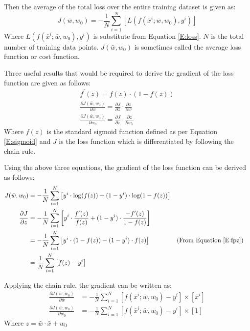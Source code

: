 \documentclass[12pt, a4paper, twoside]{article}
\begin{document}
Then the average of the total loss over the entire training dataset is given as:
\begin{equation}
	J(\bar{w}, w_0) = - \frac{1}{N} \sum_{i = 1}^{N} \left[   L(f(\bar{x}^i; \bar{w}, w_0), y^i)    \right]
\end{equation}
Where $L(f(\bar{x}^i; \bar{w}, w_0), y^i)$ is substitute from Equation \ref{E:loss}. $N$ is the total number of training data points. $J(\bar{w}, w_0)$ is sometimes called the average loss function or cost function.

Three useful results that would be required to derive the gradient of the loss function are given as follows:
\begin{gather}
	f^{\prime}(z) = f(z) \cdot (1-f(z)) \label{E:fpz}\\
	\frac{\partial J(\bar{w}, w_0)}{\partial \bar{w}} = \frac{\partial J}{\partial z} \cdot \frac{\partial z}{\partial \bar{w}} \\
	\frac{\partial J(\bar{w}, w_0)}{\partial w_0} = \frac{\partial J}{\partial z} \cdot \frac{\partial z}{\partial w_0}
\end{gather}
Where $f(z)$ is the standard sigmoid function defined as per Equation \ref{E:sigmoid} and $J$ is the loss function which is differentiated by following the chain rule.

Using the above three equations, the gradient of the loss function can be derived as follows:
\begin{align}
	J(\bar{w}, w_0) &= - \frac{1}{N} \sum_{i=1}^{N} \left[  y^i \cdot \log(f(z)) + (1-y^i) \cdot \log(1-f(z))   \right] \\
	\frac{\partial J}{\partial z} &= - \frac{1}{N} \sum_{i=1}^{N} \left[  y^i \cdot \frac{f^{\prime}(z)}{f(z)} + (1-y^i) \cdot \frac{-f^{\prime}(z)}{1-f(z)}   \right] \\
	&= - \frac{1}{N} \sum_{i=1}^{N} \left[  y^i \cdot (1-f(z)) - (1-y^i) \cdot f(z)   \right] && \text{(From Equation \ref{E:fpz}})\\
	&= \frac{1}{N} \sum_{i=1}^{N} \left[  f(z) - y^i   \right] 
\end{align}

Applying the chain rule, the gradient \cite{ang_ml} can be written as:
\begin{align}
	\frac{\partial J(\bar{w}, w_0)}{\partial \bar{w}} &= - \frac{1}{N} \sum_{i=1}^{N} \left[  f(\bar{x}^i; \bar{w}, w_0) - y^i   \right] \times \left[ \bar{x}^i \right] \\
	\frac{\partial J(\bar{w}, w_0)}{\partial w_0} &= - \frac{1}{N} \sum_{i=1}^{N} \left[  f(\bar{x}^i; \bar{w}, w_0) - y^i   \right] \times \left[ 1 \right] 
\end{align}
Where $z = \bar{w} \cdot \bar{x} + w_0$ 
\end{document}
